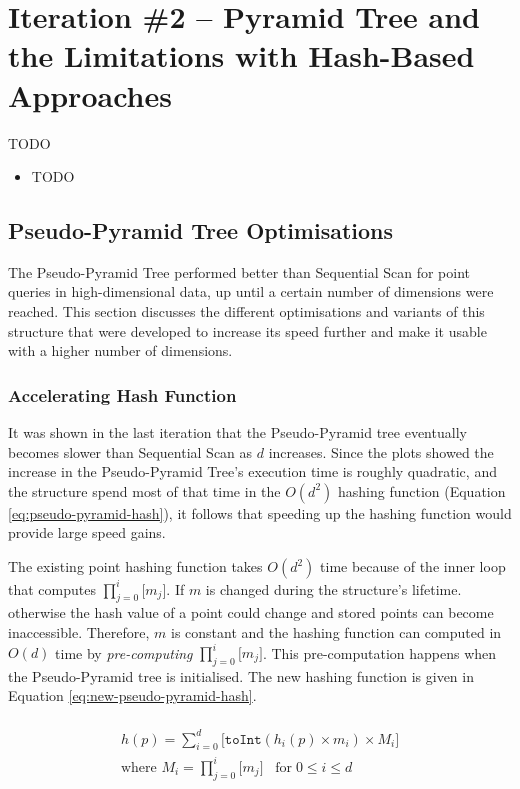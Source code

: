 \section{Iteration \#2 -- Pyramid Tree and the Limitations with Hash-Based Approaches}

TODO
\begin{itemize}
	\item TODO
\end{itemize}

\subsection{Pseudo-Pyramid Tree Optimisations}

The Pseudo-Pyramid Tree performed better than Sequential Scan for point queries in high-dimensional data, up until a certain number of dimensions were reached. This section discusses the different optimisations and variants of this structure that were developed to increase its speed further and make it usable with a higher number of dimensions.

\subsubsection{Accelerating Hash Function}

It was shown in the last iteration that the Pseudo-Pyramid tree eventually becomes slower than Sequential Scan as $d$ increases. Since the plots showed the increase in the Pseudo-Pyramid Tree's execution time is roughly quadratic, and the structure spend most of that time in the $O(d^2)$ hashing function (Equation \ref{eq:pseudo-pyramid-hash}), it follows that speeding up the hashing function would provide large speed gains.

The existing point hashing function takes $O(d^2)$ time because of the inner loop that computes $\prod_{j=0}^{i}{\lbrack m_j \rbrack}$. If $m$ is changed during the structure's lifetime. otherwise the hash value of a point could change and stored points can become inaccessible. Therefore, $m$ is constant and the hashing function can computed in $O(d)$ time by \textit{pre-computing} $\prod_{j=0}^{i}{\lbrack m_j \rbrack}$. This pre-computation happens when the Pseudo-Pyramid tree is initialised. The new hashing function is given in Equation \ref{eq:new-pseudo-pyramid-hash}.

\begin{multline}\\
	h(p) = \sum_{i = 0}^{d} { \lbrack \texttt{toInt}( h_i(p) \times m_i ) \times M_i \rbrack } \\
	\text{where } M_i = \prod_{j=0}^{i}{\lbrack m_j \rbrack} \;\;\; \text{for} \; 0 \leq i \leq d \\
	\label{eq:new-pseudo-pyramid-hash}
\end{multline}

